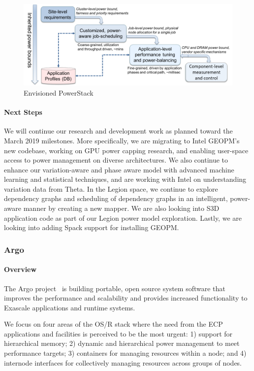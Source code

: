 \begin{figure}[t]
	\centering
	\includegraphics[scale = 0.7]{projects/2.3.1-PMR/2.3.1.19-Argo-PowerSteering/PowerStack_v2.png}
	\caption{Envisioned PowerStack}
	\label{fig:pstack}
\end{figure}

\paragraph{Next Steps}
We will continue our research and development work as planned toward the March 2019 milestones. More specifically, we are migrating to Intel GEOPM's new codebase, working on GPU power capping research, and enabling user-space access to power management on diverse architectures. We also continue to enhance our variation-aware and phase aware model with advanced machine learning and statistical techniques, and are working with Intel on understanding variation data from Theta. In the Legion space, we continue to explore dependency graphs and scheduling of dependency graphs in an intelligent, power-aware manner by creating a new mapper. We are also looking into S3D application code as part of our Legion power model  exploration. Lastly, we are looking into adding Spack support for installing GEOPM. 

\subsubsection{ Argo} 

\paragraph{Overview} 

The Argo project~\cite{perarnau2017argo} is building portable, open source system software that improves
the performance and scalability and provides increased functionality to
Exascale applications and runtime systems.

We focus on four areas of the OS/R stack where the need from the ECP
applications and facilities is perceived to be the most urgent:
1) support for hierarchical memory;
2) dynamic and hierarchical power management to meet performance
targets;
3) containers for managing resources within a node; and
4) internode interfaces for collectively managing resources across groups
of nodes.


